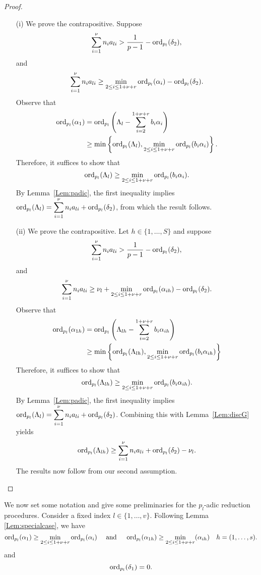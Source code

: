 \begin{proof} \
\begin{enumerate}
\item[(i)] We prove the contrapositive. Suppose
\[\sum_{i = 1}^{\nu} n_i a_{li} > \frac{1}{p-1} - \operatorname{ord}_{p_l}(\delta_2), \]
and
\[\sum_{i = 1}^{\nu} n_i a_{li}  \geq \displaystyle \min_{2 \leq i \leq 1 +\nu + r} \operatorname{ord}_{p_l}(\alpha_{i}) - \operatorname{ord}_{p_l}(\delta_2).\]
Observe that
\[\begin{split}
\operatorname{ord}_{p_l}(\alpha_{1}) 	
	& = \operatorname{ord}_{p_l}\left( \Lambda_{l} - \sum_{i = 2}^{1+\nu +r}b_i\alpha_{i}\right) \\
	& \geq \min\left\{ \operatorname{ord}_{p_l}(\Lambda_{l}), \min_{2 \leq i \leq 1+\nu+r} \operatorname{ord}_{p_l}(b_i\alpha_{i})\right\}.
\end{split}\]
Therefore, it suffices to show that 
\[\operatorname{ord}_{p_l}(\Lambda_{l}) \geq \min_{2 \leq i \leq 1 + \nu + r} \operatorname{ord}_{p_l}(b_i\alpha_{i}).\]
By Lemma~\ref{Lem:padic}, the first inequality implies $\operatorname{ord}_{p_l}(\Lambda_{l}) = \displaystyle \sum_{i = 1}^{\nu} n_ia_{li} + \operatorname{ord}_{p_l}(\delta_2)$, from which the result follows. 

\item[(ii)] We prove the contrapositive. Let $h \in \{1, \dots, S\}$ and suppose
\[\sum_{i = 1}^{\nu} n_i a_{li} > \frac{1}{p-1} - \operatorname{ord}_{p_l}(\delta_2), \]
and
\[\sum_{i = 1}^{\nu} n_i a_{li}  \geq \nu_l + \displaystyle \min_{2 \leq i \leq 1+\nu+r} \operatorname{ord}_{p_l}(\alpha_{ih}) - \operatorname{ord}_{p_l}(\delta_2).\]
Observe that 
\[\begin{split}
\operatorname{ord}_{p_l}(\alpha_{1h}) 	
	& = \operatorname{ord}_{p_l}\left( \Lambda_{lh} - \sum_{i = 2}^{1+\nu+r}b_i\alpha_{ih}\right) \\
	& \geq \min\left\{ \operatorname{ord}_{p_l}(\Lambda_{lh}), \min_{2 \leq i \leq 1+\nu+r} \operatorname{ord}_{p_l}(b_i\alpha_{ih})\right\}
\end{split}\]
Therefore, it suffices to show that 
\[\operatorname{ord}_{p_l}(\Lambda_{lh}) \geq \min_{2 \leq i \leq 1+\nu+r} \operatorname{ord}_{p_l}(b_i\alpha_{ih}).\]
By Lemma~\ref{Lem:padic}, the first inequality implies $\operatorname{ord}_{p_l}(\Lambda_{l}) = \displaystyle \sum_{i = 1}^{\nu}n_ia_{li} + \operatorname{ord}_{p_l}(\delta_2)$. Combining this with Lemma~\ref{Lem:discG} yields
\[\operatorname{ord}_{p_l}(\Lambda_{lh}) \geq \displaystyle \sum_{i = 1}^{\nu} n_ia_{li} + \operatorname{ord}_{p_l}(\delta_2) - \nu_l.\]
The results now follow from our second assumption. 
\end{enumerate}
\end{proof}


We now set some notation and give some preliminaries for the $p_l$-adic reduction procedures. Consider a fixed index $l \in \{1, \dots, v\}$. Following Lemma \ref{Lem:specialcase}, we have
\[\operatorname{ord}_{p_l}(\alpha_1) \geq \min_{2\leq i\leq 1+ \nu+ r} \operatorname{ord}_{p_l}(\alpha_i) \quad \text{ and } \quad \operatorname{ord}_{p_l}(\alpha_{1h}) \geq \min_{2\leq i\leq 1+ \nu+ r}(\alpha_{ih}) \quad h = (1, \dots, s).\]
and 
\[\operatorname{ord}_{p_l}(\delta_1) = 0.\]

